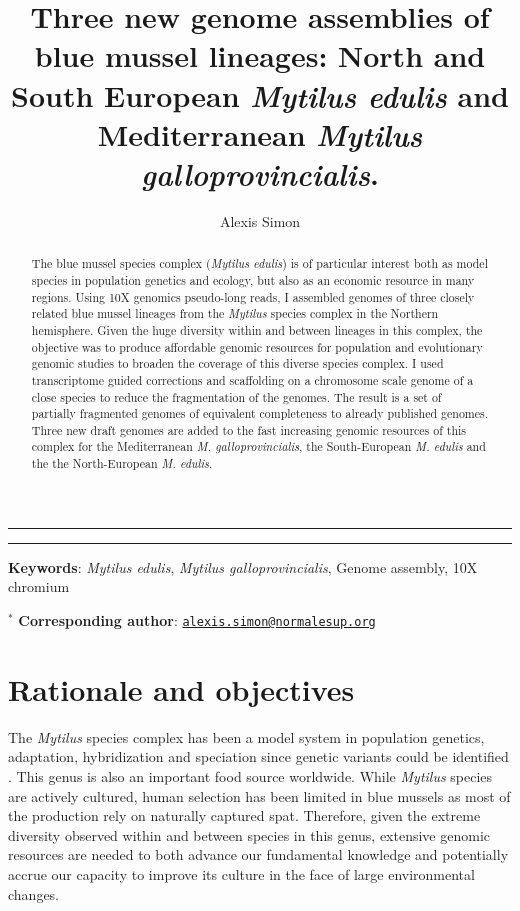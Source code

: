 \documentclass[11pt, a4paper]{article}
\title{Three new genome assemblies of blue mussel lineages: North and South European \emph{Mytilus edulis} and Mediterranean \emph{Mytilus galloprovincialis}.}
\author[1,2,*]{Alexis Simon}
\date{}
\affil[1]{ISEM, EPHE, IRD, Université Montpellier, Montpellier, France}
\affil[2]{Center of Population Biology and Department of Evolution and Ecology, University of California Davis, Davis, California, USA}
\begin{document}
\maketitle


\vspace{1cm}
\hrule
\begin{abstract}
    The blue mussel species complex (\textit{Mytilus edulis}) is of particular interest both as model species in population genetics and ecology,
    but also as an economic resource in many regions.
	Using 10X genomics pseudo-long reads, I assembled genomes of three closely related blue mussel lineages from the \emph{Mytilus} species complex in the Northern hemisphere.
	Given the huge diversity within and between lineages in this complex, 
	the objective was to produce affordable genomic resources for population and evolutionary genomic studies to broaden the coverage of this diverse species complex.
	I used transcriptome guided corrections and scaffolding on a chromosome scale genome of a close species to reduce the fragmentation of the genomes.
	The result is a set of partially fragmented genomes of equivalent completeness to already published genomes.
	Three new draft genomes are added to the fast increasing genomic resources of this complex for the Mediterranean \textit{M. galloprovincialis}, the South-European \textit{M. edulis} and the the North-European \textit{M. edulis}.
\end{abstract}

\vspace{3mm}
\hrule
\vspace{5mm}

\noindent
\textbf{Keywords}: \emph{Mytilus edulis}, \emph{Mytilus galloprovincialis}, Genome assembly, 10X chromium

\noindent
$^{*}$ \textbf{Corresponding author}: \href{mailto:alexis.simon@normalesup.org}{\nolinkurl{alexis.simon@normalesup.org}}

\newpage

\section{Rationale and objectives}\label{introduction}

The \textit{Mytilus} species complex has been a model system in population genetics, adaptation, hybridization and speciation since genetic variants could be identified \parencite{Milkman1970, Koehn1972, Ahmad1977, Skibinski1978, Quesada1995b, Bierne2003, Fraisse2016a, Simon2021}.
This genus is also an important food source worldwide.
While \textit{Mytilus} species are actively cultured,
human selection has been limited in blue mussels as most of the production rely on naturally captured spat.
Therefore, given the extreme diversity observed within and between species in this genus,
extensive genomic resources are needed to both advance our fundamental knowledge and potentially accrue our capacity to
improve its culture in the face of large environmental changes.
\end{document}
